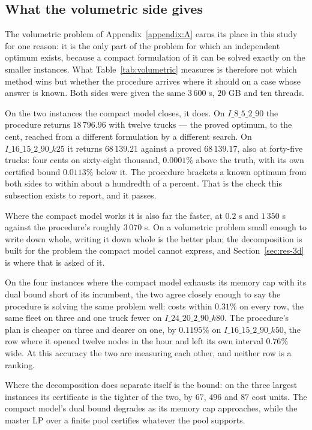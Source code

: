 \subsection{What the volumetric side gives}
\label{sec:res-vol}



The volumetric problem of Appendix~\ref{appendix:A} earns its place
in this study for one reason: it is the only part of the problem for
which an independent optimum exists, because a compact formulation of
it can be solved exactly on the smaller instances. What
Table~\ref{tab:volumetric} measures is therefore not which method
wins but whether the procedure arrives where it should on a case whose
answer is known. Both sides were given the same $3\,600$ s, $20$ GB
and ten threads.

On the two instances the compact model closes, it does. On
$I\_8\_5\_2\_90$ the procedure returns $18\,796.96$ with twelve
trucks --- the proved optimum, to the cent, reached from a different
formulation by a different search. On $I\_16\_15\_2\_90\_k25$ it
returns $68\,139.21$ against a proved $68\,139.17$, also at
forty-five trucks: four cents on sixty-eight thousand, $0.0001\%$
above the truth, with its own certified bound $0.0113\%$ below it. The
procedure brackets a known optimum from both sides to within about a
hundredth of a percent. That is the check this subsection exists to
report, and it passes.

Where the compact model works it is also far the faster, at $0.2$ s
and $1\,350$ s against the procedure's roughly $3\,070$ s. On a
volumetric problem small enough to write down whole, writing it down
whole is the better plan; the decomposition is built for the problem
the compact model cannot express, and Section~\ref{sec:res-3d} is
where that is asked of it.

On the four instances where the compact model exhausts its memory cap
with its dual bound short of its incumbent, the two agree closely
enough to say the procedure is solving the same problem well: costs
within $0.31\%$ on every row, the same fleet on three and one truck
fewer on $I\_24\_20\_2\_90\_k80$. The procedure's plan is cheaper
on three and dearer on one, by $0.1195\%$ on
$I\_16\_15\_2\_90\_k50$, the row where it opened twelve nodes in
the hour and left its own interval $0.76\%$ wide. At this accuracy the
two are measuring each other, and neither row is a ranking.

Where the decomposition does separate itself is the bound: on the
three largest instances its certificate is the tighter of the two, by
$67$, $496$ and $87$ cost units. The compact model's dual bound
degrades as its memory cap approaches, while the master LP over a
finite pool certifies whatever the pool supports.

